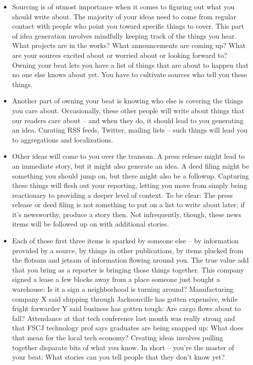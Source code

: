 \documentclass[
  12pt,
  american,
  letterpaperpaper,
  extrafontsizes,onecolumn,openright
  ]{memoir}
\providecommand{\tightlist}{%
  \setlength{\itemsep}{0pt}\setlength{\parskip}{0pt}}
\begin{document}
\begin{itemize}
\tightlist
\item
  Sourcing is of utmost importance when it comes to figuring out what you should write about. The majority of your ideas need to come from regular contact with people who point you toward specific things to cover. This part of idea generation involves mindfully keeping track of the things you hear. What projects are in the works? What announcements are coming up? What are your sources excited about or worried about or looking forward to? Owning your beat lets you have a list of things that are about to happen that no one else knows about yet. You have to cultivate sources who tell you these things.
\item
  Another part of owning your beat is knowing who else is covering the things you care about. Occasionally, these other people will write about things that our readers care about -- and when they do, it should lead to you generating an idea. Curating RSS feeds, Twitter, mailing lists -- such things will lead you to aggregations and localizations.
\item
  Other ideas will come to you over the transom. A press release might lead to an immediate story, but it might also generate an idea. A deed filing might be something you should jump on, but there might also be a followup. Capturing these things will flesh out your reporting, letting you move from simply being reactionary to providing a deeper level of context. To be clear: The press release or deed filing is not something to put on a list to write about later; if it's newsworthy, produce a story then. Not infrequently, though, these news items will be followed up on with additional stories.
\item
  Each of those first three items is sparked by someone else -- by information provided by a source, by things in other publications, by items plucked from the flotsam and jetsam of information flowing around you. The true value add that you bring as a reporter is bringing those things together. This company signed a lease a few blocks away from a place someone just bought a warehouse: Is it a sign a neighborhood is turning around? Manufacturing company X said shipping through Jacksonville has gotten expensive, while fright forwarder Y said business has gotten tough: Are cargo flows about to fall? Attendance at that tech conference last month was really strong and that FSCJ technology prof says graduates are being snapped up: What does that mean for the local tech economy? Creating ideas involves pulling together disparate bits of what you know. In short -- you're the master of your beat: What stories can you tell people that they don't know yet?
\end{itemize}
\end{document}
